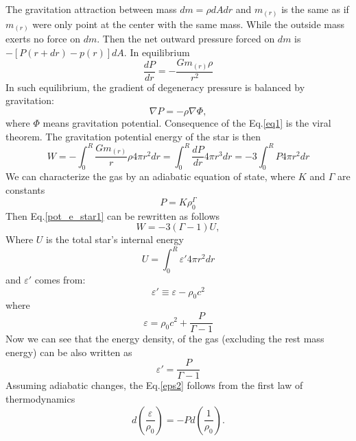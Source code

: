 \documentclass[oneside,a4paper,11pt]{report}
\begin{document}
The gravitation attraction between mass $dm = \rho dA dr$ and $m_{(r)}$ is the same as if $m_{(r)}$ were only point at the center with the same mass. While the outside mass exerts no force on $dm$.
Then the net outward pressure forced on $dm$ is $- \left [ P\left ( r + dr \right ) - p(r)  \right ]dA$. In equilibrium 
\begin{equation}
\label{eq1}
 \frac{dP}{dr} = - \frac{Gm_{(r)}\rho}{r^2}
\end{equation}
In such equilibrium, the gradient of degeneracy pressure is balanced by gravitation: 
\begin{equation}
\label{equ_1}
\nabla P = -\rho \nabla \Phi, 
\end{equation}
where $\Phi$ means gravitation potential.  
Consequence of the Eq.\eqref{eq1} is the viral theorem. The gravitation potential energy of the star is then 
\begin{equation}
\label{pot_e_star1}
W = -\int_{0}^{R} \frac{Gm_{(r)}}{r}\rho 4 \pi r^2 dr = \int_{0}^{R} \frac{dP}{dr}4\pi r^3 dr = -3\int_{0}^{R} P4 \pi r^2 dr
\end{equation}
We can characterize the gas by an adiabatic equation of state, where $K$ and $\Gamma$ are constants
\begin{equation}
 \label{adiab_1}
P = K\rho_0^\Gamma
\end{equation}
Then Eq.\eqref{pot_e_star1} can be rewritten as follows
\begin{equation}
 W = -3 (\Gamma - 1) U,
\end{equation}
Where $U$ is the total star's internal energy 
\begin{equation}
U = \int_{0}^{R}\varepsilon' 4\pi r^2 dr 
\end{equation}
and $\varepsilon'$ comes from:
\begin{equation}
\label{eps1}
 \varepsilon' \equiv \varepsilon - \rho_0 c^2
\end{equation}
where
\begin{equation}
 \varepsilon = \rho_0c^2+\frac{P}{\Gamma -1}
\end{equation}
Now we can see that the energy density, of the gas (excluding the rest mass energy) can be also written as
\begin{equation}
 \label{eps2}
 \varepsilon'=\frac{P}{\Gamma - 1}
\end{equation}
Assuming adiabatic changes, the Eq.\eqref{eps2} follows from the first law of thermodynamics
\begin{equation}
 d\left ( \frac{\varepsilon }{\rho_0} \right ) = -Pd\left ( \frac{1}{\rho_0} \right ) .
\end{equation}
\end{document}

